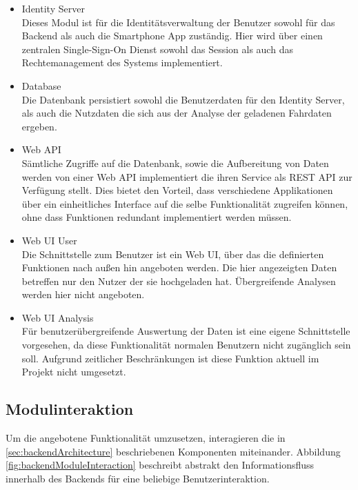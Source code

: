 \begin{itemize}
\item Identity Server \\
Dieses Modul ist für die Identitätsverwaltung der Benutzer sowohl für das Backend als auch die Smartphone App zuständig. Hier wird über einen zentralen Single-Sign-On Dienst sowohl das Session als auch das Rechtemanagement des Systems implementiert.
\item Database \\
Die Datenbank persistiert sowohl die Benutzerdaten für den Identity Server, als auch die Nutzdaten die sich aus der Analyse der geladenen Fahrdaten ergeben. 
\item Web API \\
Sämtliche Zugriffe auf die Datenbank, sowie die Aufbereitung von Daten werden von einer Web API implementiert die ihren Service als REST API zur Verfügung stellt. Dies bietet den Vorteil, dass verschiedene Applikationen über ein einheitliches Interface auf die selbe Funktionalität zugreifen können, ohne dass Funktionen redundant implementiert werden müssen.
\item Web UI User \\
Die Schnittstelle zum Benutzer ist ein Web UI, über das die definierten Funktionen nach außen hin angeboten werden. Die hier angezeigten Daten betreffen nur den Nutzer der sie hochgeladen hat. Übergreifende Analysen werden hier nicht angeboten.
\item Web UI Analysis \\
Für benutzerübergreifende Auswertung der Daten ist eine eigene Schnittstelle vorgesehen, da diese Funktionalität normalen Benutzern nicht zugänglich sein soll. Aufgrund zeitlicher Beschränkungen ist diese Funktion aktuell im Projekt nicht umgesetzt.
\end{itemize}

\subsection{Modulinteraktion}
Um die angebotene Funktionalität umzusetzen, interagieren die in \ref{sec:backendArchitecture} beschriebenen Komponenten miteinander. Abbildung \ref{fig:backendModuleInteraction} beschreibt abstrakt den Informationsfluss innerhalb des Backends für eine beliebige Benutzerinteraktion. \\

